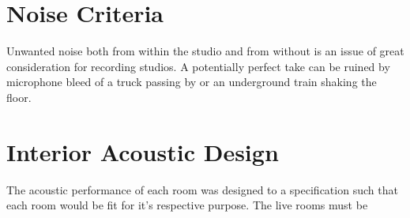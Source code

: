 \documentclass[10pt, twocolumn]{article}
\begin{document}
    \section{Noise Criteria}
        Unwanted noise both from within the studio and from without is an issue of great consideration for recording studios.
        A potentially perfect take can be ruined by microphone bleed of a truck passing by or an underground train shaking the floor.
        


    \section{Interior Acoustic Design}
        The acoustic performance of each room was designed to a specification such that each room would be fit for it's respective purpose.
        The live rooms must be 
\end{document}
